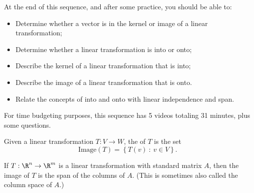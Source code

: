 







At the end of this sequence, and after some practice, you should be able to:

\begin{itemize}
\item Determine whether a vector is in the kernel or image of a linear transformation;
\item Determine whether a linear transformation is into or onto;
\item Describe the kernel of a linear transformation that is into;  
\item Describe the image of a linear transformation that is onto. 
\item Relate the concepts of into and onto with linear independence and span.  
\end{itemize}


For time budgeting purposes, this sequence has 5 videos totaling 31 minutes, 
plus some questions.  




\endedxtext

\endedxvertical










\endedxvertical





{}  
Given a linear transformation $T: V\rightarrow W$, the  {} of $T$ is the set
\[ \mathrm{Image}(T) =  \left\{ T(v) \ : \ v \in V\right\}. \] 

{}  
If $T: \R^n \rightarrow \R^m$ is a linear transformation with standard matrix $A$, then the image of $T$
is the span of the columns of $A$.  (This is sometimes also called the column space of $A$.)  

\endedxtext





